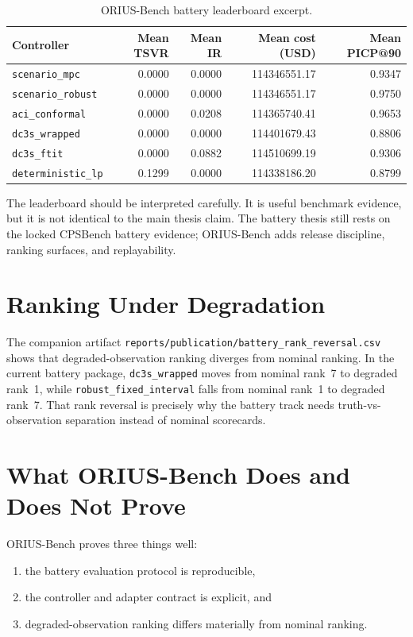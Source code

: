 \begin{table}[ht]
\centering
\caption{ORIUS-Bench battery leaderboard excerpt.}
\label{tab:orius-bench-leaderboard}
\begin{tabular}{lrrrr}
\toprule
\textbf{Controller} & \textbf{Mean TSVR} & \textbf{Mean IR} &
  \textbf{Mean cost (USD)} & \textbf{Mean PICP@90} \\
\midrule
\texttt{scenario\_mpc} & 0.0000 & 0.0000 & 114346551.17 & 0.9347 \\
\texttt{scenario\_robust} & 0.0000 & 0.0000 & 114346551.17 & 0.9750 \\
\texttt{aci\_conformal} & 0.0000 & 0.0208 & 114365740.41 & 0.9653 \\
\texttt{dc3s\_wrapped} & 0.0000 & 0.0000 & 114401679.43 & 0.8806 \\
\texttt{dc3s\_ftit} & 0.0000 & 0.0882 & 114510699.19 & 0.9306 \\
\texttt{deterministic\_lp} & 0.1299 & 0.0000 & 114338186.20 & 0.8799 \\
\bottomrule
\end{tabular}
\end{table}

The leaderboard should be interpreted carefully.  It is useful benchmark
evidence, but it is not identical to the main thesis claim.  The battery
thesis still rests on the locked CPSBench battery evidence; ORIUS-Bench adds
release discipline, ranking surfaces, and replayability.

\section{Ranking Under Degradation}

The companion artifact \texttt{reports/publication/battery\_rank\_reversal.csv}
shows that degraded-observation ranking diverges from nominal ranking.  In
the current battery package, \texttt{dc3s\_wrapped} moves from nominal rank~7
to degraded rank~1, while \texttt{robust\_fixed\_interval} falls from nominal
rank~1 to degraded rank~7.  That rank reversal is precisely why the battery
track needs truth-vs-observation separation instead of nominal scorecards.

\section{What ORIUS-Bench Does and Does Not Prove}

ORIUS-Bench proves three things well:

\begin{enumerate}
  \item the battery evaluation protocol is reproducible,
  \item the controller and adapter contract is explicit, and
  \item degraded-observation ranking differs materially from nominal ranking.
\end{enumerate}


